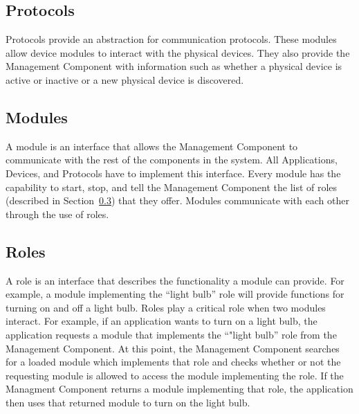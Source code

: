 \subsection{Protocols}
\label{sec:protocols}
Protocols provide an abstraction for communication protocols. These modules
allow device modules to interact with the physical devices. They also provide
the Management Component with information such as whether a physical device is
active or inactive or a new physical device is discovered.
\subsection{Modules}
\label{sec:mods}
A module is an interface that allows the Management Component to communicate
with the rest of the components in the system. All Applications, Devices, and
Protocols have to implement this interface. Every module has the capability to
start, stop, and tell the Management Component the list of roles (described in 
Section~\ref{sec:roles}) that they offer. Modules communicate with each
other through the use of roles.
\subsection{Roles}
\label{sec:roles}
A role is an interface that describes the functionality a module can provide. 
For example, a module implementing the ``light bulb'' role will provide functions
for turning on and off a light bulb. Roles play a critical role when two
modules interact. For example, if an application wants to turn on a light bulb,
the application requests a module that implements the ``"light bulb'' role from 
the Management Component. At this point, the Management Component searches for a
loaded module which implements that role and checks whether or not the
requesting module is allowed to access the module implementing the role. If the
Managment Component returns a module implementing that role, the application
then uses that returned module to turn on the light bulb.
